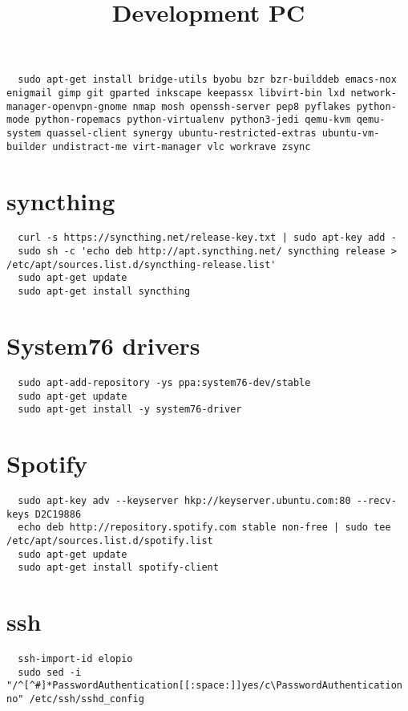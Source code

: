 \documentclass[12pt]{article}
\title{Development PC}
\begin{document}
\begin{verbatim}
  sudo apt-get install bridge-utils byobu bzr bzr-builddeb emacs-nox enigmail gimp git gparted inkscape keepassx libvirt-bin lxd network-manager-openvpn-gnome nmap mosh openssh-server pep8 pyflakes python-mode python-ropemacs python-virtualenv python3-jedi qemu-kvm qemu-system quassel-client synergy ubuntu-restricted-extras ubuntu-vm-builder undistract-me virt-manager vlc workrave zsync
\end{verbatim}

\section{syncthing}

\begin{verbatim}
  curl -s https://syncthing.net/release-key.txt | sudo apt-key add -
  sudo sh -c 'echo deb http://apt.syncthing.net/ syncthing release > /etc/apt/sources.list.d/syncthing-release.list'
  sudo apt-get update
  sudo apt-get install syncthing
\end{verbatim}

\section{System76 drivers}

\begin{verbatim}
  sudo apt-add-repository -ys ppa:system76-dev/stable
  sudo apt-get update
  sudo apt-get install -y system76-driver
\end{verbatim}

\section{Spotify}

\begin{verbatim}
  sudo apt-key adv --keyserver hkp://keyserver.ubuntu.com:80 --recv-keys D2C19886
  echo deb http://repository.spotify.com stable non-free | sudo tee /etc/apt/sources.list.d/spotify.list
  sudo apt-get update
  sudo apt-get install spotify-client
\end{verbatim}

\section{ssh}
\begin{verbatim}
  ssh-import-id elopio
  sudo sed -i "/^[^#]*PasswordAuthentication[[:space:]]yes/c\PasswordAuthentication no" /etc/ssh/sshd_config
\end{verbatim}
\end{document}
